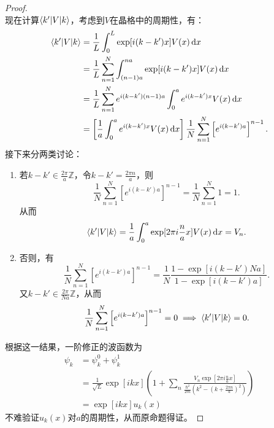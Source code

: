 \begin{proof}
\begin{equation}
    \end{equation}
    现在计算$\braket{k'|V|k}$，考虑到$V$在晶格中的周期性，有：
    \begin{equation}
        \begin{aligned}
            \braket{k'|V|k} &= \frac{1}{L} \int_0^L \exp[i(k-k')x] V(x) \, \mathrm d x \\
            &= \frac{1}{L} \sum_{n=1}^N \int_{(n-1)a}^{na} \exp[i(k-k')x] V(x) \, \mathrm d x \\
            &= \frac{1}{L} \sum_{n=1}^N e^{i(k-k')(n-1)a} \int_0^a e^{i(k-k')x} V(x) \, \mathrm d x \\
            &= \left[ \frac{1}{a} \int_0^a e^{i(k-k')x} V(x) \,\mathrm d x \right] \frac{1}{N} \sum_{n=1}^N \left[e^{i(k-k')a}\right]^{n-1}.
        \end{aligned}
    \end{equation}
    接下来分两类讨论：
    \begin{enumerate}
        \item 若$k-k' \in \frac{2\pi}{a} \mathbb Z$，令$k-k' = \frac{2\pi n}{a}$，则
        \begin{equation}
            \frac{1}{N} \sum_{n=1}^N \left[e^{i(k-k')a}\right]^{n-1} = \frac{1}{N} \sum_{n=1}^N 1 = 1.
        \end{equation}
        从而
        \begin{equation}
            \braket{k'|V|k} = \frac{1}{a} \int_0^a \exp[2\pi i \frac{n}{a} x] V(x) \, \mathrm d x = V_n.
        \end{equation}
        \item 否则，有
        \begin{equation}
            \frac{1}{N} \sum_{n=1}^N \left[e^{i(k-k')a}\right]^{n-1} = \frac{1}{N} \frac{1 - \exp[i(k-k') Na]}{1 - \exp[i(k-k')a]}.
        \end{equation}
        又$k-k' \in \frac{2\pi}{Na} \mathbb Z$，从而
        \begin{equation}
            \frac{1}{N} \sum_{n=1}^N \left[e^{i(k-k')a}\right]^{n-1} = 0 \implies \braket{k'|V|k} = 0.
        \end{equation}
    \end{enumerate}
    根据这一结果，一阶修正的波函数为
    \begin{equation}
        \begin{aligned}
            \psi_k &= \psi_k^0 + \psi_k^1 \\
            &= \frac{1}{\sqrt{L}} \exp[ikx] \left( 1 + \sum_n \frac{V_n \exp[2\pi i \frac{n}{a} x]}{\frac{\hbar^2}{2m} \left( k^2 - (k + \frac{2\pi n}{a})^2 \right)} \right) \\
            &= \exp[ikx] u_k(x)
        \end{aligned}
    \end{equation}
    不难验证$u_k(x)$对$a$的周期性，从而原命题得证。
\end{proof}

